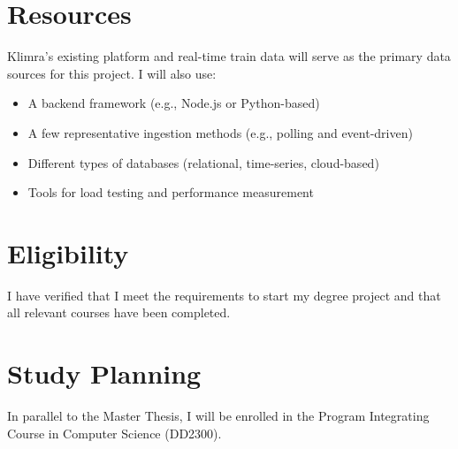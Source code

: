 \documentclass[a4paper,12pt]{article}
\begin{document}
\section{Resources}
Klimra’s existing platform and real-time train data will serve as the primary data sources for this project. I will also use:
\begin{itemize}
    \item A backend framework (e.g., Node.js or Python-based)
    \item A few representative ingestion methods (e.g., polling and event-driven)
    \item Different types of databases (relational, time-series, cloud-based)
    \item Tools for load testing and performance measurement
\end{itemize}


\section{Eligibility}
I have verified that I meet the requirements to start my degree project and that all relevant courses have been completed.

\section{Study Planning}
In parallel to the Master Thesis, I will be enrolled in the Program Integrating Course in Computer Science (DD2300).
\end{document}
